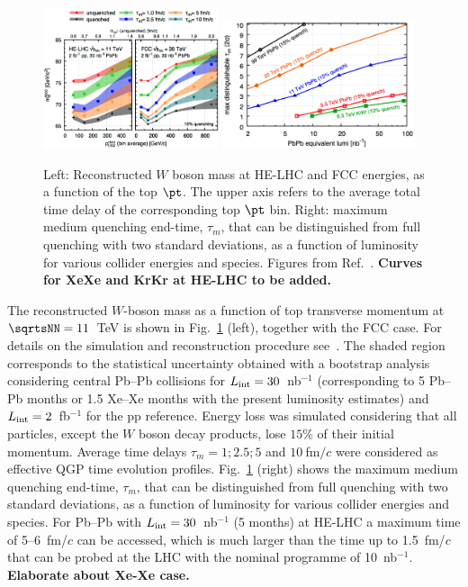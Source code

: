 \documentclass[../report.tex]{subfiles}
\begin{document}
\begin{figure}[!t]
\begin{center}
\includegraphics[width=0.46\textwidth]{helhc/figs/WMass_tops.pdf}
\hfill
\includegraphics[width=0.5\textwidth]{helhc/figs/Taum_tops.pdf}
\caption{Left: Reconstructed $W$ boson mass at HE-LHC and FCC
  energies, as a function of the top $\pt$. The upper axis refers to
  the average total time delay of the corresponding top $\pt$
  bin. Right: maximum medium quenching
end-time, $\tau_m$, that can be distinguished from full quenching with
two standard deviations, as a function of luminosity for various
collider energies and species. Figures from Ref.~\cite{Apolinario:2017sob}. {\bf Curves for XeXe and KrKr at HE-LHC to be added.} }
\label{fig:tops}
\end{center}
\end{figure}


The reconstructed $W$-boson mass as a function of top transverse
momentum at $\sqrtsNN = 11$~TeV is shown in Fig.~\ref{fig:tops}
(left), together with the FCC case. For details on the simulation and reconstruction procedure
see~\cite{Apolinario:2017sob}. 
The shaded region corresponds to the statistical uncertainty obtained
with a bootstrap analysis considering central Pb--Pb collisions for
$L_{\rm int} = 30$~nb$^{-1}$ (corresponding to 5 Pb--Pb months or 1.5 Xe--Xe months with the present luminosity estimates)
and $L_{\rm int} = 2$~fb$^{-1}$ for the pp reference.
Energy loss was simulated considering that all particles, except the $W$ boson decay products, lose $15\%$ of their initial momentum. 
Average time delays $\tau_m = 1; 2.5; 5$ and $10~$fm$/c$ were considered as effective QGP time evolution profiles. 
Fig.~\ref{fig:tops} (right) shows the maximum medium quenching
end-time, $\tau_m$, that can be distinguished from full quenching with
two standard deviations, as a function of luminosity for various
collider energies and species. For Pb--Pb with $L_{\rm int}=30$~nb$^{-1}$ (5 months) 
at HE-LHC a maximum time of 5--6~fm/$c$ can be accessed, which is much
larger than the time up to 1.5~fm/$c$ that can be probed at the LHC with the nominal programme of 
10~nb$^{-1}$. {\bf Elaborate about Xe-Xe case.}
\end{document}
